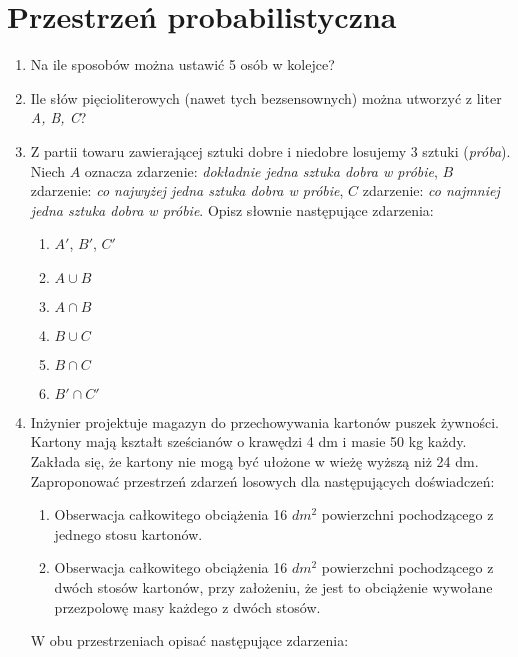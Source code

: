 \documentclass[twoside]{mwart}
\newcommand{\ans}[1]{}
\newcommand{\ans}[1]{\par\emph{Odpowiedź:} #1}
\begin{document}
\section{Przestrzeń probabilistyczna}

\begin{enumerate}
\item Na ile sposobów można ustawić 5 osób w kolejce? \ans{$5!$}
\item Ile słów pięcioliterowych (nawet tych bezsensownych) można utworzyć z liter \emph{A, B, C}? \ans{$3^5=243$}
\item Z partii towaru zawierającej sztuki dobre i niedobre losujemy 3 sztuki (\emph{próba}). Niech $A$ oznacza zdarzenie: \emph{dokładnie jedna sztuka dobra w próbie}, $B$ zdarzenie: \emph{co najwyżej jedna sztuka dobra w próbie}, $C$ zdarzenie: \emph{co najmniej jedna sztuka dobra w próbie}. Opisz słownie następujące zdarzenia:
\begin{enumerate}
\item $A'$, $B'$, $C'$
\item $A\cup B$
\item $A\cap B$
\item $B\cup C$
\item $B\cap C$
\item $B'\cap C'$
\end{enumerate}
\item Inżynier projektuje magazyn do przechowywania kartonów puszek żywności. Kartony mają kształt sześcianów o krawędzi 4 dm i masie 50 kg każdy. Zakłada się, że kartony nie mogą być ułożone w wieżę wyższą niż 24 dm. Zaproponować przestrzeń zdarzeń losowych dla następujących doświadczeń:
\begin{enumerate}
\item Obserwacja całkowitego obciążenia 16 $dm^2$ powierzchni pochodzącego z jednego stosu kartonów.
\item Obserwacja całkowitego obciążenia 16 $dm^2$ powierzchni pochodzącego z dwóch stosów kartonów, przy założeniu, że jest to obciążenie wywołane przezpolowę masy każdego z dwóch stosów.
\end{enumerate}
W obu przestrzeniach opisać następujące zdarzenia:
\begin{description}

\end{description}
\end{enumerate}
\end{document}
